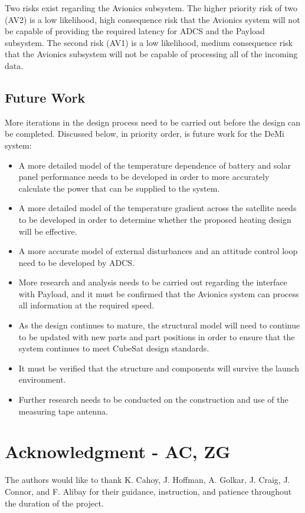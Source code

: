 \documentclass[12pt]{article}
\begin{document}
Two risks exist regarding the Avionics subsystem.  The higher priority risk of two (AV2) is a low likelihood, high consequence risk that the Avionics system will not be capable of providing the required latency for ADCS and the Payload subsystem.  The second risk (AV1) is a low likelihood, medium consequence risk that the Avionics subsystem will not be capable of processing all of the incoming data.  


		\subsection{Future Work}\label{sec:conclusion_futurework}
More iterations in the design process need to be carried out before the design can be completed.  Discussed below, in priority order, is future work for the DeMi system:
\begin{itemize}
\item A more detailed model of the temperature dependence of battery and solar panel performance needs to be developed in order to more accurately calculate the power that can be supplied to the system.  
\item A more detailed model of the temperature gradient across the satellite needs to be developed in order to determine whether the proposed heating design will be effective.  
\item A more accurate model of external disturbances and an attitude control loop need to be developed by ADCS.
\item More research and analysis needs to be carried out regarding the interface with Payload, and it must be confirmed that the Avionics system can process all information at the required speed.  
\item As the design continues to mature, the structural model will need to continue to be updated with new parts and part positions in order to ensure that the system continues to meet CubeSat design standards.
\item It must be verified that the structure and components will survive the launch environment.
\item Further research needs to be conducted on the construction and use of the measuring tape antenna.  
\end{itemize}

		
\FloatBarrier
\newpage

\section{Acknowledgment - AC, ZG}
The authors would like to thank K. Cahoy, J. Hoffman, A. Golkar, J. Craig, J. Connor, and F. Alibay for their guidance, instruction, and patience throughout the duration of the project.
\end{document}
